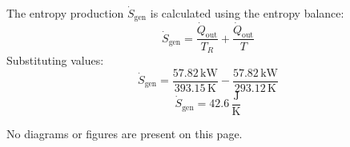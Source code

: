 The entropy production \( \dot{S}_{\text{gen}} \) is calculated using the entropy balance:  
\[
\dot{S}_{\text{gen}} = \frac{\dot{Q}_{\text{out}}}{T_R} + \frac{\dot{Q}_{\text{out}}}{T}
\]  
Substituting values:  
\[
\dot{S}_{\text{gen}} = \frac{57.82 \, \text{kW}}{393.15 \, \text{K}} - \frac{57.82 \, \text{kW}}{293.12 \, \text{K}}
\]  
\[
\dot{S}_{\text{gen}} = 42.6 \, \frac{\text{J}}{\text{K}}
\]  

No diagrams or figures are present on this page.